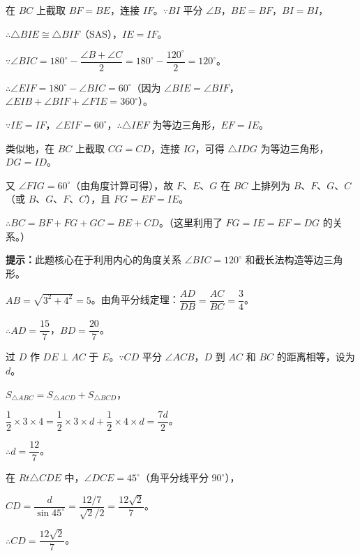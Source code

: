 \documentclass[12pt, a4paper]{ctexart}
\begin{document}
\begin{knowledgebox}[第 2 题 参考答案]
在 \(BC\) 上截取 \(BF = BE\)，连接 \(IF\)。\(\because BI\) 平分 \(\angle B\)，\(BE = BF\)，\(BI = BI\)，

\(\therefore \triangle BIE \cong \triangle BIF\)（SAS），\(IE = IF\)。

\(\because \angle BIC = 180^\circ - \dfrac{\angle B + \angle C}{2} = 180^\circ - \dfrac{120^\circ}{2} = 120^\circ\)。

\(\therefore \angle EIF = 180^\circ - \angle BIC = 60^\circ\)（因为 \(\angle BIE = \angle BIF\)，\(\angle EIB + \angle BIF + \angle FIE = 360^\circ\)）。

\(\because IE = IF\)，\(\angle EIF = 60^\circ\)，\(\therefore \triangle IEF\) 为等边三角形，\(EF = IE\)。

类似地，在 \(BC\) 上截取 \(CG = CD\)，连接 \(IG\)，可得 \(\triangle IDG\) 为等边三角形，\(DG = ID\)。

又 \(\angle FIG = 60^\circ\)（由角度计算可得），故 \(F\)、\(E\)、\(G\) 在 \(BC\) 上排列为 \(B\)、\(F\)、\(G\)、\(C\)（或 \(B\)、\(G\)、\(F\)、\(C\)），且 \(FG = EF = IE\)。

\(\therefore BC = BF + FG + GC = BE + CD\)。（这里利用了 \(FG = IE = EF = DG\) 的关系。）

\medskip
\textbf{提示：}此题核心在于利用内心的角度关系 \(\angle BIC = 120^\circ\) 和截长法构造等边三角形。
\end{knowledgebox}

\begin{knowledgebox}[第 3 题 参考答案]
\(AB = \sqrt{3^2 + 4^2} = 5\)。由角平分线定理：\(\dfrac{AD}{DB} = \dfrac{AC}{BC} = \dfrac{3}{4}\)。

\(\therefore AD = \dfrac{15}{7}\)，\(BD = \dfrac{20}{7}\)。

过 \(D\) 作 \(DE \perp AC\) 于 \(E\)。\(\because CD\) 平分 \(\angle ACB\)，\(D\) 到 \(AC\) 和 \(BC\) 的距离相等，设为 \(d\)。

\(S_{\triangle ABC} = S_{\triangle ACD} + S_{\triangle BCD}\)，

\(\dfrac{1}{2} \times 3 \times 4 = \dfrac{1}{2} \times 3 \times d + \dfrac{1}{2} \times 4 \times d = \dfrac{7d}{2}\)。

\(\therefore d = \dfrac{12}{7}\)。

在 \(Rt\triangle CDE\) 中，\(\angle DCE = 45^\circ\)（角平分线平分 \(90^\circ\)），

\(CD = \dfrac{d}{\sin 45^\circ} = \dfrac{12/7}{\sqrt{2}/2} = \dfrac{12\sqrt{2}}{7}\)。

\(\therefore CD = \dfrac{12\sqrt{2}}{7}\)。
\end{knowledgebox}
\end{document}
